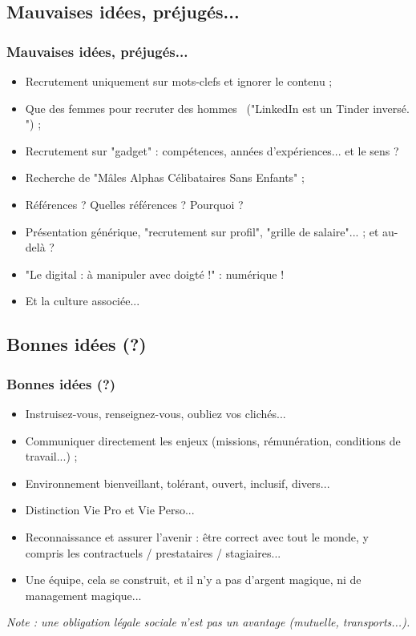 \documentclass[slidetop,11pt]{beamer}
\begin{document}
\subsection{Mauvaises id{\'e}es, pr{\'e}jug{\'e}s...}
\begin{frame}
	\frametitle{Mauvaises id{\'e}es, pr{\'e}jug{\'e}s...}
	\begin{itemize}
		\item Recrutement uniquement sur mots-clefs et ignorer le contenu ; 
		\item Que des femmes pour recruter des hommes~\newline
		("LinkedIn est un Tinder invers{\'e}. ") ; 
		\item Recrutement sur "gadget" : comp{\'e}tences, ann{\'e}es d'exp{\'e}riences... et le sens ?
		\item Recherche de "M{\^a}les Alphas C{\'e}libataires Sans Enfants" ; 
		\item R{\'e}f{\'e}rences ? Quelles r{\'e}f{\'e}rences ? Pourquoi ?
		\item Pr{\'e}sentation g{\'e}n{\'e}rique, "recrutement sur profil", "grille de salaire"... ; et au-del{\`a} ? 
		\item "Le digital : {\`a} manipuler avec doigt{\'e} !" : num{\'e}rique !
		\item Et la culture associ{\'e}e... 
	\end{itemize}
\end{frame}

\subsection{Bonnes id{\'e}es (?)}
\begin{frame}
	\frametitle{Bonnes id{\'e}es (?)}
	\begin{itemize}
		\item Instruisez-vous, renseignez-vous, oubliez vos clich{\'e}s...
		\item Communiquer directement les enjeux (missions, r{\'e}mun{\'e}ration, conditions de travail...) ;
		\item Environnement bienveillant, tol{\'e}rant, ouvert, inclusif, divers...
		\item Distinction Vie Pro et Vie Perso...
		\item Reconnaissance et assurer l'avenir : {\^e}tre correct avec tout le monde, y compris les contractuels / prestataires / stagiaires...
		\item Une {\'e}quipe, cela se construit, et il n'y a pas d'argent magique, ni de management magique...
	\end{itemize}
	
	\emph{Note : une obligation l{\'e}gale sociale n'est pas un avantage (mutuelle, transports...). } 
\end{frame}
\end{document}
